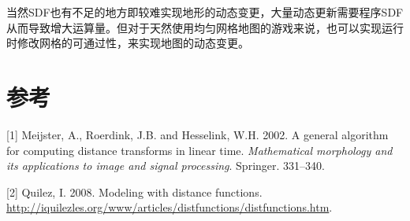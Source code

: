 当然SDF也有不足的地方即较难实现地形的动态变更，大量动态更新需要程序SDF从而导致增大运算量。但对于天然使用均匀网格地图的游戏来说，也可以实现运行时修改网格的可通过性，来实现地图的动态变更。

\hypertarget{ux53c2ux8003}{%
\section*{参考}\label{ux53c2ux8003}}

\hypertarget{refs}{}
\leavevmode\hypertarget{ref-meijster2002general}{}%
{[}1{]} Meijster, A., Roerdink, J.B. and Hesselink, W.H. 2002. A general
algorithm for computing distance transforms in linear time.
\emph{Mathematical morphology and its applications to image and signal
processing}. Springer. 331--340.

\leavevmode\hypertarget{ref-quilez2008modeling}{}%
{[}2{]} Quilez, I. 2008. Modeling with distance functions.
\url{http://iquilezles.org/www/articles/distfunctions/distfunctions.htm}.
